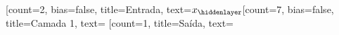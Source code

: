 \documentclass{standalone}
\begin{document}
\begin{neuralnetwork}[height=7]
		\newcommand{\nodetextx}[2]{$x_{#2}$}
		\newcommand{\nodenone}[2]{} 
		[count=2, bias=false, title=Entrada, text=\nodetextx]  
		\hiddenlayer[count=7, bias=false, title=Camada 1, text=\nodenone] \linklayers 
		\outputlayer[count=1, title=Saída, text=\nodenone] \linklayers 
\end{neuralnetwork}
\end{document}
